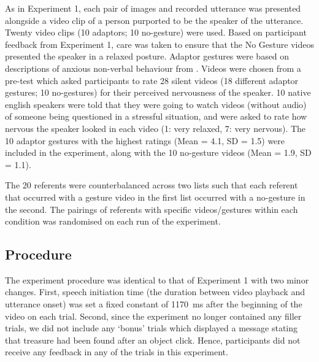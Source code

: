 \documentclass[a4paper,man,natbib]{apa6}
\begin{document}
As in Experiment 1, each pair of images and recorded utterance was presented alongside a video clip of a person purported to be the speaker of the utterance.
Twenty video clips (10 adaptors; 10 no-gesture) were used. 
Based on participant feedback from Experiment 1, care was taken to ensure that the No Gesture videos presented the speaker in a relaxed posture. 
Adaptor gestures were based on descriptions of anxious non-verbal behaviour from \citet{Gregersen2005}.
Videos were chosen from a pre-test which asked participants to rate 28 silent videos (18 different adaptor gestures; 10 no-gestures) for their perceived nervousness of the speaker. 
10 native english speakers were told that they were going to watch videos (without audio) of someone being questioned in a stressful situation, and were asked to rate how nervous the speaker looked in each video (1: very relaxed, 7: very nervous). 
The 10 adaptor gestures with the highest ratings (Mean = 4.1, SD = 1.5) were included in the experiment, along with the 10 no-gesture videos (Mean = 1.9, SD = 1.1).

The 20 referents were counterbalanced across two lists such that each referent that occurred with a gesture video in the first list occurred with a no-gesture in the second.
The pairings of referents with specific videos/gestures within each condition was randomised on each run of the experiment.

\subsection{Procedure}
The experiment procedure was identical to that of Experiment 1 with two minor changes.
First, speech initiation time (the duration between video playback and utterance onset) was set a fixed constant of 1170~ms after the beginning of the video on each trial.
Second, since the experiment no longer contained any filler trials, we did not include any `bonus' trials which displayed a message stating that treasure had been found after an object click.
Hence, participants did not receive any feedback in any of the trials in this experiment.
\end{document}
